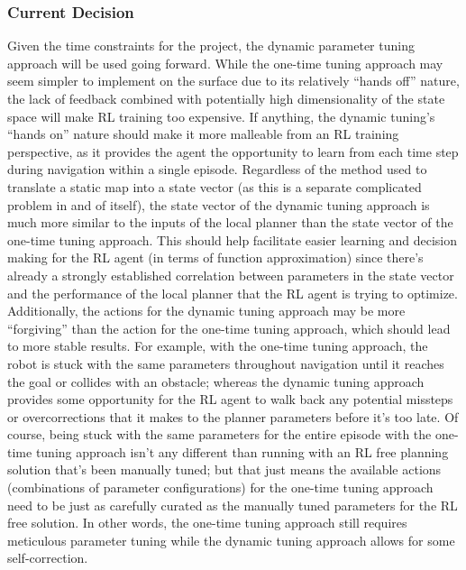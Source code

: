 \documentclass[conference]{IEEEtran}
\begin{document}
        \subsubsection{Current Decision}
        Given the time constraints for the project, the dynamic parameter tuning approach will be used going forward. While the one-time tuning approach may seem simpler to implement on the surface due to its relatively ``hands off'' nature, the lack of feedback combined with potentially high dimensionality of the state space will make RL training too expensive. If anything, the dynamic tuning's ``hands on'' nature should make it more malleable from an RL training perspective, as it provides the agent the opportunity to learn from each time step during navigation within a single episode. Regardless of the method used to translate a static map into a state vector (as this is a separate complicated problem in and of itself), the state vector of the dynamic tuning approach is much more similar to the inputs of the local planner than the state vector of the one-time tuning approach. This should help facilitate easier learning and decision making for the RL agent (in terms of function approximation) since there's already a strongly established correlation between parameters in the state vector and the performance of the local planner that the RL agent is trying to optimize. Additionally, the actions for the dynamic tuning approach may be more ``forgiving'' than the action for the one-time tuning approach, which should lead to more stable results. For example, with the one-time tuning approach, the robot is stuck with the same parameters throughout navigation until it reaches the goal or collides with an obstacle; whereas the dynamic tuning approach provides some opportunity for the RL agent to walk back any potential missteps or overcorrections that it makes to the planner parameters before it's too late. Of course, being stuck with the same parameters for the entire episode with the one-time tuning approach isn't any different than running with an RL free planning solution that's been manually tuned; but that just means the available actions (combinations of parameter configurations) for the one-time tuning approach need to be just as carefully curated as the manually tuned parameters for the RL free solution. In other words, the one-time tuning approach still requires meticulous parameter tuning while the dynamic tuning approach allows for some self-correction.
\end{document}
